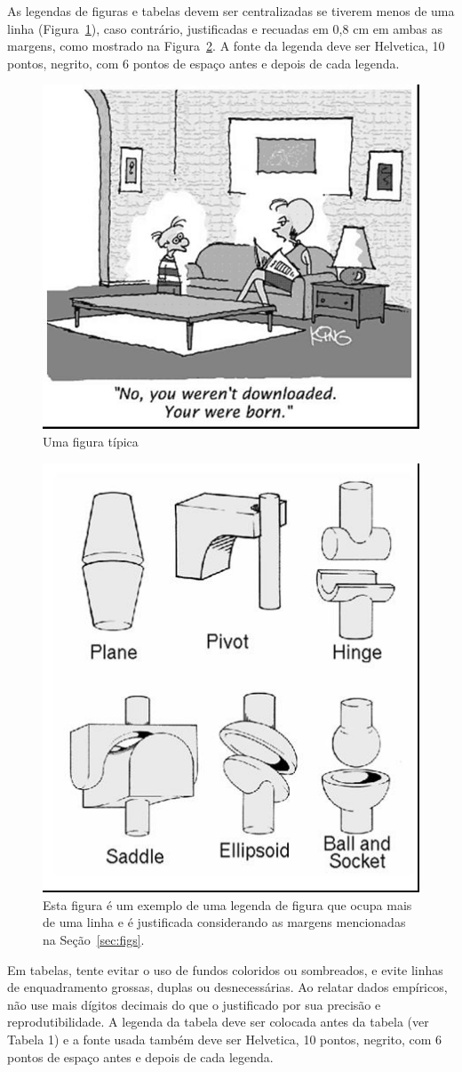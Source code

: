 \documentclass[12pt]{article}
\begin{document}
As legendas de figuras e tabelas devem ser centralizadas se tiverem menos de uma linha
(Figura~\ref{fig:exampleFig1}), caso contrário, justificadas e recuadas em 0,8 cm em
ambas as margens, como mostrado na Figura~\ref{fig:exampleFig2}. A fonte da legenda deve
ser Helvetica, 10 pontos, negrito, com 6 pontos de espaço antes e depois de cada
legenda.

\begin{figure}[ht]
\centering
\includegraphics[width=.5\textwidth]{fig1.jpg}
\caption{Uma figura típica}
\label{fig:exampleFig1}
\end{figure}

\begin{figure}[ht]
\centering
\includegraphics[width=.3\textwidth]{fig2.jpg}
\caption{Esta figura é um exemplo de uma legenda de figura que ocupa mais de uma
linha e é justificada considerando as margens mencionadas na Seção~\ref{sec:figs}.}
\label{fig:exampleFig2}
\end{figure}

Em tabelas, tente evitar o uso de fundos coloridos ou sombreados, e evite
linhas de enquadramento grossas, duplas ou desnecessárias. Ao relatar dados empíricos,
não use mais dígitos decimais do que o justificado por sua precisão e
reprodutibilidade. A legenda da tabela deve ser colocada antes da tabela (ver Tabela 1)
e a fonte usada também deve ser Helvetica, 10 pontos, negrito, com 6 pontos de
espaço antes e depois de cada legenda.
\end{document}
